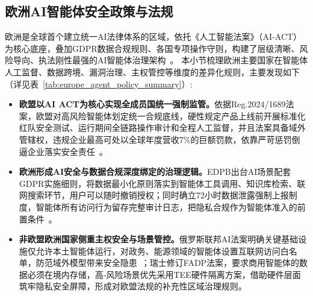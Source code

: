 \begin{center}
\subsection{欧洲AI智能体安全政策与法规}
欧洲是全球首个建立统一AI法律体系的区域，依托《人工智能法案》（AI‑ACT）为核心底座，叠加GDPR数据合规规则、各国专项操作守则，构建了层级清晰、风险导向、执法刚性最强的AI智能体治理架构~\cite{eu_ai_act_2024}。
本小节梳理欧洲主要国家在智能体人工监督、数据跨境、漏洞治理、主权管控等维度的差异化规则，主要发现如下（详见表~\ref{tab:europe_agent_policy_summary}）:

\begin{itemize}[tabitem]
    \item \textbf{欧盟以AI ACT为核心实现全成员国统一强制监管。}依据Reg.2024/1689法案，欧盟对高风险智能体划定统一合规底线，硬性规定产品上线前开展标准化红队安全测试、运行期间全链路操作审计和全程人工监督，并且法案具备域外管辖权，违规企业最高可处以全球年度营收7\%的巨额罚款，依靠严苛惩罚倒逼企业落实安全责任~\cite{eu_ai_act_2024}。

    \item \textbf{欧洲形成AI安全与数据合规深度绑定的治理逻辑。}EDPB出台AI场景配套GDPR实施细则，将数据最小化原则落实到智能体工具调用、知识库检索、联网搜索环节，用户可以随时撤销授权；同时确立72小时数据泄露强制上报制度，智能体所有访问行为留存完整审计日志，把隐私合规作为智能体准入的前置条件~\cite{eu_gpai_code_of_practice_2025}。

    \item \textbf{非欧盟欧洲国家侧重主权安全与场景管控。}俄罗斯联邦AI法案明确关键基础设施仅允许本土智能体运行，对政务、能源领域的智能体设置互联网访问白名单，防范域外模型带来安全隐患~\cite{Russia_AI_Draft}；瑞士修订FADP法案，要求商用智能体的数据必须在境内存储，高‑风险场景优先采用TEE硬件隔离方案，借助硬件层面筑牢隐私安全屏障，形成对欧盟法规的补充性区域治理规则。
\end{itemize}





\end{center}
